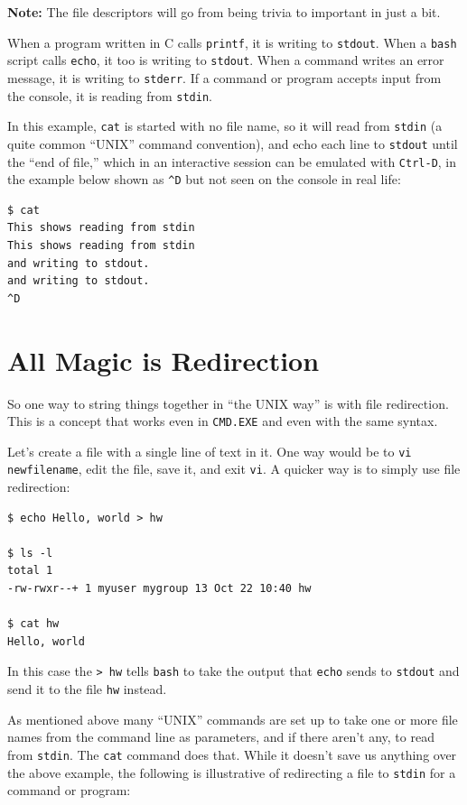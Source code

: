 \documentclass[10pt,]{book}
\numberwithin{figure}{chapter}
\begin{document}
\textbf{Note:} The file descriptors will go from being trivia to
important in just a bit.

When a program written in C calls \texttt{printf}, it is writing to
\texttt{stdout}. When a \texttt{bash} script calls \texttt{echo}, it too
is writing to \texttt{stdout}. When a command writes an error message,
it is writing to \texttt{stderr}. If a command or program accepts input
from the console, it is reading from \texttt{stdin}.

In this example, \texttt{cat} is started with no file name, so it will
read from \texttt{stdin} (a quite common ``UNIX'' command convention),
and echo each line to \texttt{stdout} until the ``end of file,'' which
in an interactive session can be emulated with \texttt{Ctrl-D}, in the
example below shown as \texttt{\^{}D} but not seen on the console in
real life:

\begin{verbatim}
$ cat
This shows reading from stdin
This shows reading from stdin
and writing to stdout.
and writing to stdout.
^D
\end{verbatim}

\section{All Magic is Redirection}\label{all-magic-is-redirection}

So one way to string things together in ``the UNIX way'' is with file
redirection. This is a concept that works even in \texttt{CMD.EXE} and
even with the same syntax.

Let's create a file with a single line of text in it. One way would be
to \texttt{vi newfilename}, edit the file, save it, and exit
\texttt{vi}. A quicker way is to simply use file redirection:

\begin{verbatim}
$ echo Hello, world > hw

$ ls -l
total 1
-rw-rwxr--+ 1 myuser mygroup 13 Oct 22 10:40 hw

$ cat hw
Hello, world
\end{verbatim}

In this case the \texttt{\textgreater{} hw} tells \texttt{bash} to take
the output that \texttt{echo} sends to \texttt{stdout} and send it to
the file \texttt{hw} instead.

As mentioned above many ``UNIX'' commands are set up to take one or more
file names from the command line as parameters, and if there aren't any,
to read from \texttt{stdin}. The \texttt{cat} command does that. While
it doesn't save us anything over the above example, the following is
illustrative of redirecting a file to \texttt{stdin} for a command or
program:
\end{document}
